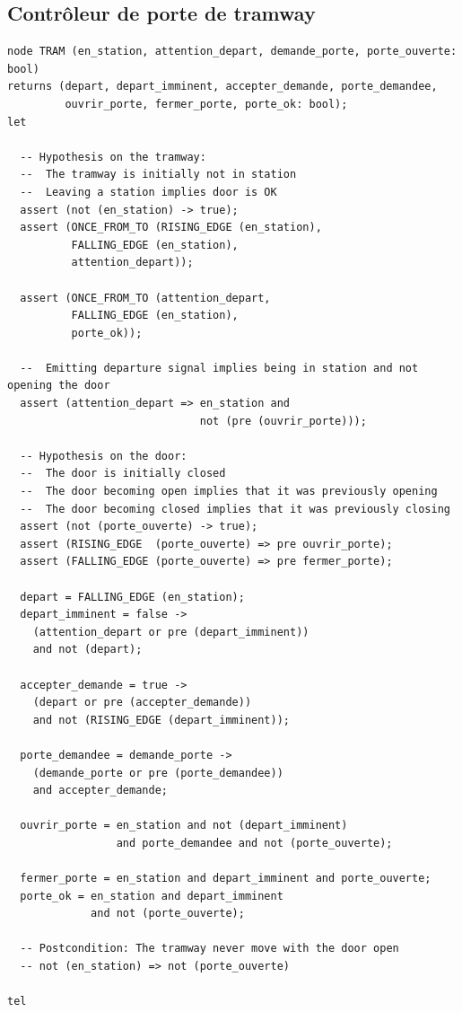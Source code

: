 \documentclass{article}
\begin{document}
    \subsection{Contrôleur de porte de tramway}
      \begin{lstlisting}
node TRAM (en_station, attention_depart, demande_porte, porte_ouverte: bool)
returns (depart, depart_imminent, accepter_demande, porte_demandee,
         ouvrir_porte, fermer_porte, porte_ok: bool);
let

  -- Hypothesis on the tramway:
  --  The tramway is initially not in station
  --  Leaving a station implies door is OK
  assert (not (en_station) -> true);
  assert (ONCE_FROM_TO (RISING_EDGE (en_station),
          FALLING_EDGE (en_station),
          attention_depart));

  assert (ONCE_FROM_TO (attention_depart,
          FALLING_EDGE (en_station),
          porte_ok));

  --  Emitting departure signal implies being in station and not opening the door
  assert (attention_depart => en_station and
                              not (pre (ouvrir_porte)));

  -- Hypothesis on the door:
  --  The door is initially closed
  --  The door becoming open implies that it was previously opening
  --  The door becoming closed implies that it was previously closing 
  assert (not (porte_ouverte) -> true);
  assert (RISING_EDGE  (porte_ouverte) => pre ouvrir_porte);
  assert (FALLING_EDGE (porte_ouverte) => pre fermer_porte);

  depart = FALLING_EDGE (en_station);
  depart_imminent = false ->
    (attention_depart or pre (depart_imminent))
    and not (depart);

  accepter_demande = true ->
    (depart or pre (accepter_demande))
    and not (RISING_EDGE (depart_imminent));

  porte_demandee = demande_porte ->
    (demande_porte or pre (porte_demandee))
    and accepter_demande;

  ouvrir_porte = en_station and not (depart_imminent)
                 and porte_demandee and not (porte_ouverte);

  fermer_porte = en_station and depart_imminent and porte_ouverte;
  porte_ok = en_station and depart_imminent
             and not (porte_ouverte);

  -- Postcondition: The tramway never move with the door open
  -- not (en_station) => not (porte_ouverte)

tel
      \end{lstlisting}      
\end{document}
